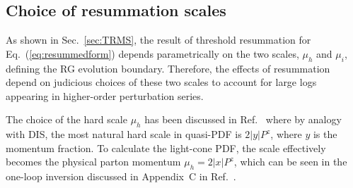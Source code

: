 \documentclass[a4paper,11pt]{article}
\begin{document}
\subsection{Choice of resummation scales}\label{sec:scalcho}

As shown in Sec.~\ref{sec:TRMS}, the result of threshold resummation for Eq.~(\ref{eq:resummedform}) depends parametrically on the two scales, $\mu_h$ and $\mu_i$, defining the RG evolution boundary. Therefore, the effects of resummation depend on judicious choices of these two scales to account for large logs appearing in higher-order perturbation series. 

The choice of the hard scale $\mu_h$ has been discussed in Ref.~\cite{Su:2022fiu} where by analogy with DIS, the most natural hard scale in quasi-PDF is $2 |y| P^z$, where $y$ is the momentum fraction. To calculate the light-cone PDF, the scale effectively becomes the physical parton momentum $\mu_h=2 |x| P^z$, which can be seen in the one-loop inversion discussed in Appendix~C in Ref.~\cite{Su:2022fiu}. 
\end{document}

